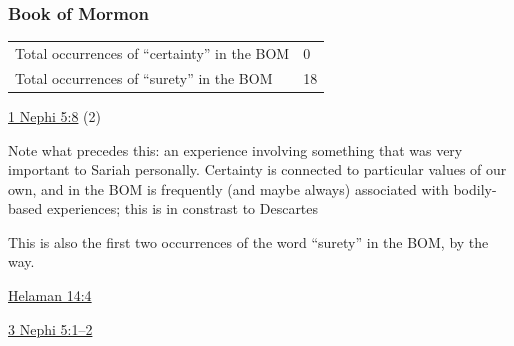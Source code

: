 				
				
		
	\subsubsection{Book of Mormon} %
		\label{CERTAINTY-BOM}
	
		\begin{tabular}{ll}
			Total occurrences of ``certainty'' in the BOM & 0 \\
			Total occurrences of ``surety'' in the BOM & 18
		\end{tabular}
		
		\begin{compactdesc}
			\item[{\hyperref[1NEPHI-5-8]{1 Nephi 5:8}}] (2)
				\begin{compactitem}
					\item Note what precedes this: an experience involving something that was very important to Sariah personally. Certainty is connected to particular values of our own, and in the BOM is frequently (and maybe always) associated with bodily-based experiences; this is in constrast to Descartes
					\item This is also the first two occurrences of the word ``surety'' in the BOM, by the way.
				\end{compactitem}
			\item[{\hyperref[HELAMAN-14-4]{Helaman 14:4}}]
			\item[{\hyperref[3NEPHI-5-1]{3 Nephi 5:1--2}}]
		\end{compactdesc}
		
	
